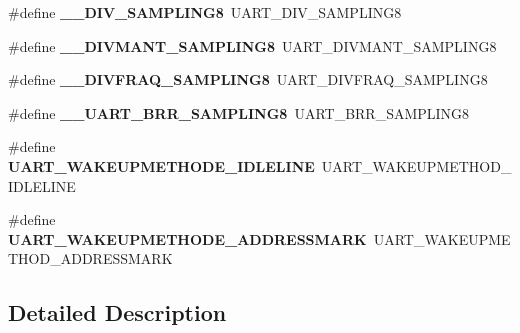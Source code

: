 \begin{DoxyCompactItemize}
\item 
\hypertarget{group___h_a_l___u_a_r_t___aliased___defines_ga5cba2faadc25e5ece57cd3322adf4151}{\#define {\bfseries \-\_\-\-\_\-\-D\-I\-V\-\_\-\-S\-A\-M\-P\-L\-I\-N\-G8}~U\-A\-R\-T\-\_\-\-D\-I\-V\-\_\-\-S\-A\-M\-P\-L\-I\-N\-G8}\label{group___h_a_l___u_a_r_t___aliased___defines_ga5cba2faadc25e5ece57cd3322adf4151}

\item 
\hypertarget{group___h_a_l___u_a_r_t___aliased___defines_ga79e617709be4f56d9a327ca3a7dc316f}{\#define {\bfseries \-\_\-\-\_\-\-D\-I\-V\-M\-A\-N\-T\-\_\-\-S\-A\-M\-P\-L\-I\-N\-G8}~U\-A\-R\-T\-\_\-\-D\-I\-V\-M\-A\-N\-T\-\_\-\-S\-A\-M\-P\-L\-I\-N\-G8}\label{group___h_a_l___u_a_r_t___aliased___defines_ga79e617709be4f56d9a327ca3a7dc316f}

\item 
\hypertarget{group___h_a_l___u_a_r_t___aliased___defines_gac09eaea0db063364f5aac90f47791989}{\#define {\bfseries \-\_\-\-\_\-\-D\-I\-V\-F\-R\-A\-Q\-\_\-\-S\-A\-M\-P\-L\-I\-N\-G8}~U\-A\-R\-T\-\_\-\-D\-I\-V\-F\-R\-A\-Q\-\_\-\-S\-A\-M\-P\-L\-I\-N\-G8}\label{group___h_a_l___u_a_r_t___aliased___defines_gac09eaea0db063364f5aac90f47791989}

\item 
\hypertarget{group___h_a_l___u_a_r_t___aliased___defines_ga446f5df9b1c7c4f2bded186402dd4e62}{\#define {\bfseries \-\_\-\-\_\-\-U\-A\-R\-T\-\_\-\-B\-R\-R\-\_\-\-S\-A\-M\-P\-L\-I\-N\-G8}~U\-A\-R\-T\-\_\-\-B\-R\-R\-\_\-\-S\-A\-M\-P\-L\-I\-N\-G8}\label{group___h_a_l___u_a_r_t___aliased___defines_ga446f5df9b1c7c4f2bded186402dd4e62}

\item 
\hypertarget{group___h_a_l___u_a_r_t___aliased___defines_gab6e73a11dc29f715c2f3e48df9d9f30f}{\#define {\bfseries U\-A\-R\-T\-\_\-\-W\-A\-K\-E\-U\-P\-M\-E\-T\-H\-O\-D\-E\-\_\-\-I\-D\-L\-E\-L\-I\-N\-E}~U\-A\-R\-T\-\_\-\-W\-A\-K\-E\-U\-P\-M\-E\-T\-H\-O\-D\-\_\-\-I\-D\-L\-E\-L\-I\-N\-E}\label{group___h_a_l___u_a_r_t___aliased___defines_gab6e73a11dc29f715c2f3e48df9d9f30f}

\item 
\hypertarget{group___h_a_l___u_a_r_t___aliased___defines_ga0535d8a60a1563f7216a0f4b62a39c43}{\#define {\bfseries U\-A\-R\-T\-\_\-\-W\-A\-K\-E\-U\-P\-M\-E\-T\-H\-O\-D\-E\-\_\-\-A\-D\-D\-R\-E\-S\-S\-M\-A\-R\-K}~U\-A\-R\-T\-\_\-\-W\-A\-K\-E\-U\-P\-M\-E\-T\-H\-O\-D\-\_\-\-A\-D\-D\-R\-E\-S\-S\-M\-A\-R\-K}\label{group___h_a_l___u_a_r_t___aliased___defines_ga0535d8a60a1563f7216a0f4b62a39c43}

\end{DoxyCompactItemize}


\subsection{Detailed Description}
